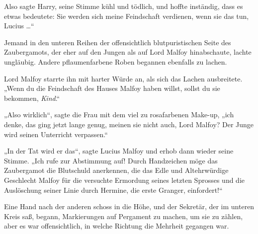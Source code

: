 Also sagte Harry, seine Stimme kühl und tödlich, und hoffte inständig, dass es etwas bedeutete:
Sie werden sich meine Feindschaft verdienen, wenn sie das tun, Lucius …“

Jemand in den unteren Reihen der offensichtlich blutpuristischen Seite des Zaubergamots, der eher auf den Jungen als auf Lord Malfoy hinabschaute, lachte ungläubig. Andere pflaumenfarbene Roben begannen ebenfalls zu lachen.

Lord Malfoy starrte ihn mit harter Würde an, als sich das Lachen ausbreitete.
„Wenn du die Feindschaft des Hauses Malfoy haben willst, sollst du sie bekommen, \emph{Kind}.“

„Also wirklich“, sagte die Frau mit dem viel zu rosafarbenen Make-up, „ich denke, das ging jetzt lange genug, meinen sie nicht auch, Lord Malfoy? Der Junge wird seinen Unterricht verpassen.“

„In der Tat wird er das“, sagte Lucius Malfoy und erhob dann wieder seine Stimme.
„Ich rufe zur Abstimmung auf! Durch Handzeichen möge das Zaubergamot die Blutschuld anerkennen, die das Edle und Altehrwürdige Geschlecht Malfoy für die versuchte Ermordung seines letzten Sprosses und die Auslöschung seiner Linie durch Hermine, die erste Granger, einfordert!“

Eine Hand nach der anderen schoss in die Höhe, und der Sekretär, der im unteren Kreis saß, begann, Markierungen auf Pergament zu machen, um sie zu zählen, aber es war offensichtlich, in welche Richtung die Mehrheit gegangen war.

